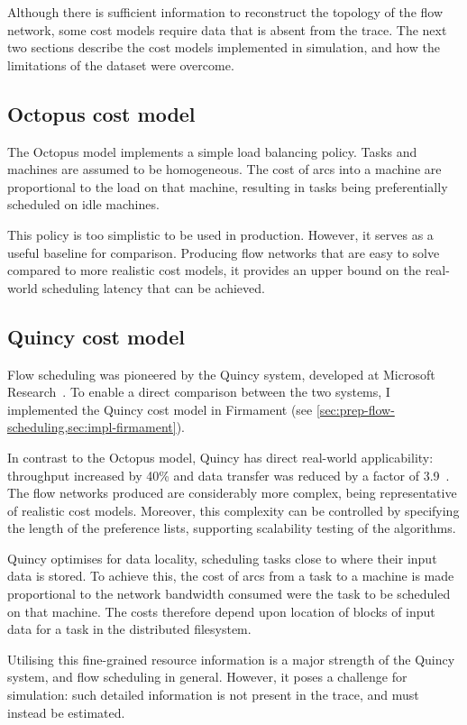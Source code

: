 Although there is sufficient information to reconstruct the topology of the flow network, some cost models require data that is absent from the trace. The next two sections describe the cost models implemented in simulation, and how the limitations of the dataset were overcome.

\subsection{Octopus cost model}

The Octopus model implements a simple load balancing policy. Tasks and machines are assumed to be homogeneous. The cost of arcs into a machine are proportional to the load on that machine, resulting in tasks being preferentially scheduled on idle machines. 

This policy is too simplistic to be used in production. However, it serves as a useful baseline for comparison. Producing flow networks that are easy to solve compared to more realistic cost models, it provides an upper bound on the real-world scheduling latency that can be achieved.

\subsection{Quincy cost model}

Flow scheduling was pioneered by the Quincy system, developed at Microsoft Research~\cite{Isard:2009}. To enable a direct comparison between the two systems, I implemented the Quincy cost model in Firmament (see \cref{sec:prep-flow-scheduling,sec:impl-firmament}).

In contrast to the Octopus model, Quincy has direct real-world applicability: throughput increased by 40\% and data transfer was reduced by a factor of 3.9~\cite{Isard:2009}. The flow networks produced are considerably more complex, being representative of realistic cost models. Moreover, this complexity can be controlled by specifying the length of the preference lists, supporting scalability testing of the algorithms.

Quincy optimises for data locality, scheduling tasks close to where their input data is stored. To achieve this, the cost of arcs from a task to a machine is made proportional to the network bandwidth consumed were the task to be scheduled on that machine. The costs therefore depend upon location of blocks of input data for a task in the distributed filesystem.

Utilising this fine-grained resource information is a major strength of the Quincy system, and flow scheduling in general. However, it poses a challenge for simulation: such detailed information is not present in the trace, and must instead be estimated. 

